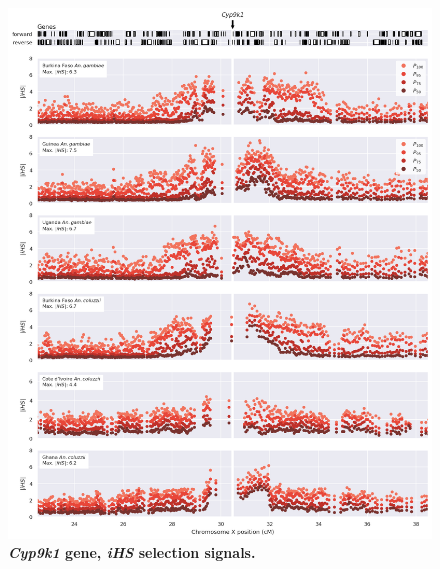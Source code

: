 \documentclass[a4paper,11pt,abstracton,hidelinks]{scrartcl}
\begin{document}
\clearpage


\begin{figure}[t!]
	\begin{center}
		\includegraphics*[width=1.1\linewidth,center]{artwork/locus_cyp9k1_ihs.png}
	\end{center}
	\caption[\textit{Cyp9k1} gene, \textit{iHS} selection signals]{
	\textbf{\textit{Cyp9k1} gene, \textit{iHS} selection signals.}
	} 
	\label{fig:locus_cyp9k1_ihs}
\end{figure}


\clearpage
\end{document}
